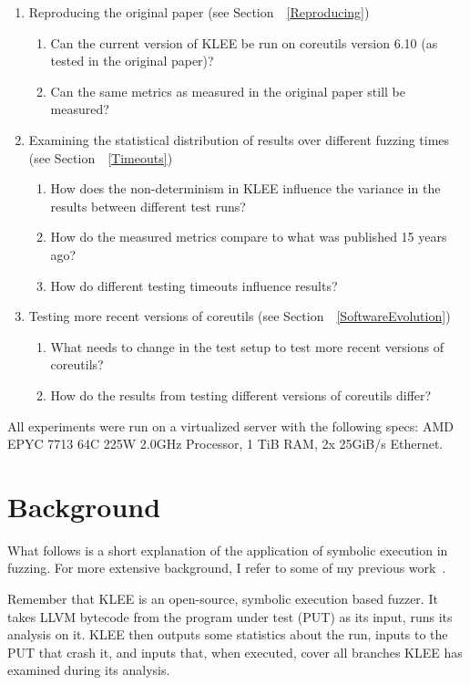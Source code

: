 \documentclass{article}
\let\savedCite=\cite
\renewcommand{\cite}{\unskip~\savedCite}
\let\savedRef=\ref
\renewcommand{\ref}{\unskip~\savedRef}
\begin{document}
\begin{enumerate}
    \item Reproducing the original paper (see Section~\ref{Reproducing})
          \begin{enumerate}
              \item Can the current version of KLEE be run on coreutils version 6.10 (as tested in the original paper)?
              \item Can the same metrics as measured in the original paper still be measured?
          \end{enumerate}
    \item Examining the statistical distribution of results over different fuzzing times (see Section~\ref{Timeouts})
          \begin{enumerate}
              \item How does the non-determinism in KLEE influence the variance in the results between different test runs?
              \item How do the measured metrics compare to what was published 15 years ago?
              \item How do different testing timeouts influence results?
          \end{enumerate}
    \item Testing more recent versions of coreutils (see Section~\ref{SoftwareEvolution})
          \begin{enumerate}
              \item What needs to change in the test setup to test more recent versions of coreutils?
              \item How do the results from testing different versions of coreutils differ?
          \end{enumerate}
\end{enumerate}

All experiments were run on a virtualized server with the following specs: AMD EPYC 7713 64C 225W 2.0GHz Processor, 1 TiB RAM, 2x 25GiB/s Ethernet.
\section{Background}

What follows is a short explanation of the application of symbolic execution in fuzzing. For more extensive background, I refer to some of my previous work\cite{EVA, BA}.

Remember that KLEE is an open-source, symbolic execution based fuzzer. It takes LLVM bytecode from the program under test (PUT) as its input, runs its analysis on it. KLEE then outputs some statistics about the run, inputs to the PUT that crash it, and inputs that, when executed, cover all branches KLEE has examined during its analysis.
\end{document}
